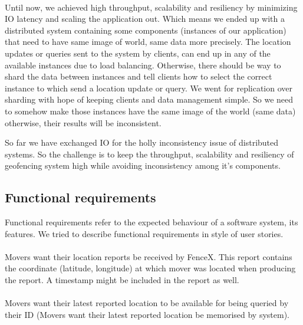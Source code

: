 \documentclass[a4]{report}
\begin{document}
    \paragraph{}
    Until now, we achieved high throughput, scalability and resiliency by minimizing IO latency and scaling the
    application out.
    Which means we ended up with a distributed system containing some components (instances of our application) that
    need to have same image of world, same data more precisely.
    The location updates or queries sent to the system by clients, can end up in any of the available instances due
    to load balancing.
    Otherwise, there should be way to shard the data between instances and tell clients how to select the correct
    instance to which send a location update or query.
    We went for replication over sharding with hope of keeping clients and data management simple.
    So we need to somehow make those instances have the same image of the world (same data) otherwise, their results
    will be inconsistent.

    So far we have exchanged IO for the holly inconsistency issue of distributed systems.
    So the challenge is to keep the throughput, scalability and resiliency of geofencing system high while avoiding
    inconsistency among it's components.

    \subsection{Functional requirements}
    Functional requirements refer to the expected behaviour of a software system, its features.
    We tried to describe functional requirements in style of user stories\cite{userStory}.

    \paragraph{}
    Movers want their location reports be received by FenceX.
    This report contains the coordinate (latitude, longitude) at which mover was located when producing the report.
    A timestamp might be included in the report as well.

    \paragraph{}
    Movers want their latest reported location to be available for being queried by their ID (Movers want their
    latest reported location be memorised by system).
\end{document}

